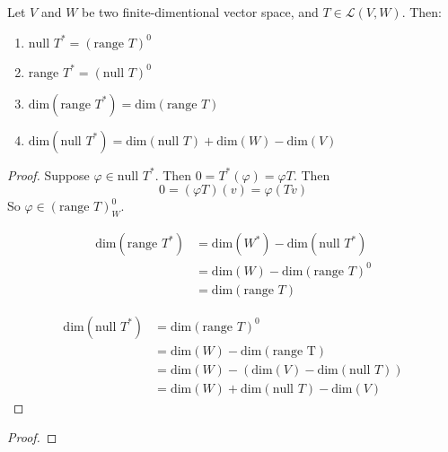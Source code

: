 \begin{theorem}
    Let $V$ and $W$ be two finite-dimentional vector space, and $T \in \mathcal{L}(V,W)$. Then:
    \begin{enumerate}
        \item $\text{null } T^* = (\text{range } T)^0$
        \item $\text{range } T^* = (\text{null } T)^0$
        \item $\text{dim} (\text{range } T^*) = \text{dim} ( \text{range } T)$
        \item $\text{dim}(\text{null } T^*) = \text{dim}(\text{null } T) + \text{dim}(W) - \text{dim}(V)$
    \end{enumerate}
\end{theorem}

\begin{proof}
    Suppose $\varphi \in \text{null } T^*$. Then $ 0 = T^*(\varphi) = \varphi T$. Then
    \begin{equation*}
        0 = (\varphi T)(v) = \varphi (Tv) 
    \end{equation*}
    So $\varphi \in (\text{range } T)^0_W$.
    
    \begin{equation*}
        \begin{aligned}
            \text{dim}(\text{range } T^*) &= \text{dim}(W^*) - \text{dim}(\text{null } T^*) \\
            &= \text{dim}(W) - \text{dim}(\text{range } T)^0 \\
            &= \text{dim}(\text{range } T)
        \end{aligned}
    \end{equation*}
    
    \begin{equation*}
        \begin{aligned}
            \text{dim}(\text{null }  T^*) &= \text{dim}(\text{range } T)^0  \\
            &= \text{dim}(W) - \text{dim}(\text{range T}) \\
            &= \text{dim}(W) - (\text{dim}(V) - \text{dim}(\text{null } T))\\
            &= \text{dim}(W) + \text{dim}(\text{null } T) - \text{dim}(V)
        \end{aligned}
    \end{equation*}
\end{proof}

\begin{proof}
    
\end{proof}

